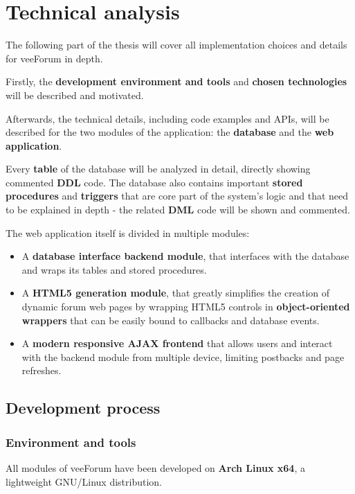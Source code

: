 \documentclass[12pt]{report}
\renewcommand\emph{\textbf}
\begin{document}
    \part{Technical analysis}
        The following part of the thesis will cover all implementation choices and details for veeForum in depth.

        Firstly, the \emph{development environment and tools} and \emph{chosen technologies} will be described and motivated.

        Afterwards, the technical details, including code examples and APIs, will be described for the two modules of the application: the \emph{database} and the \emph{web application}.

        Every \emph{table} of the database will be analyzed in detail, directly showing commented \emph{DDL} code. The database also contains important \emph{stored procedures} and \emph{triggers} that are core part of the system's logic and that need to be explained in depth - the related \emph{DML} code will be shown and commented.

        The web application itself is divided in multiple modules:
        \begin{itemize}
            \item A \emph{database interface backend module}, that interfaces with the database and wraps its tables and stored procedures.
            \item A \emph{HTML5 generation module}, that greatly simplifies the creation of dynamic forum web pages by wrapping HTML5 controls in \emph{object-oriented wrappers} that can be easily bound to callbacks and database events.
            \item A \emph{modern responsive AJAX frontend} that allows users and interact with the backend module from multiple device, limiting postbacks and page refreshes.
        \end{itemize}
         
        \chapter{Development process}

            \section{Environment and tools}
                All modules of veeForum have been developed on \emph{Arch Linux x64}, a lightweight GNU/Linux distribution.
\end{document}
